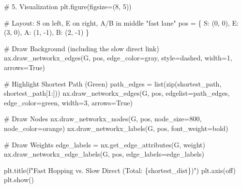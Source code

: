 \documentclass[
  letterpaper,
  DIV=11,
  numbers=noendperiod]{scrreprt}
\newenvironment{Shaded}{\begin{snugshade}}{\end{snugshade}}
\newcommand{\BuiltInTok}[1]{\textcolor[rgb]{0.00,0.23,0.31}{#1}}
\newcommand{\CommentTok}[1]{\textcolor[rgb]{0.37,0.37,0.37}{#1}}
\newcommand{\DecValTok}[1]{\textcolor[rgb]{0.68,0.00,0.00}{#1}}
\newcommand{\NormalTok}[1]{\textcolor[rgb]{0.00,0.23,0.31}{#1}}
\newcommand{\OperatorTok}[1]{\textcolor[rgb]{0.37,0.37,0.37}{#1}}
\newcommand{\SpecialCharTok}[1]{\textcolor[rgb]{0.37,0.37,0.37}{#1}}
\newcommand{\SpecialStringTok}[1]{\textcolor[rgb]{0.13,0.47,0.30}{#1}}
\newcommand{\StringTok}[1]{\textcolor[rgb]{0.13,0.47,0.30}{#1}}
\newcommand{\VariableTok}[1]{\textcolor[rgb]{0.07,0.07,0.07}{#1}}
\begin{document}
\begin{Shaded}
\begin{Highlighting}[]
\CommentTok{\# 5. Visualization}
\NormalTok{plt.figure(figsize}\OperatorTok{=}\NormalTok{(}\DecValTok{8}\NormalTok{, }\DecValTok{5}\NormalTok{))}

\CommentTok{\# Layout: S on left, E on right, A/B in middle "fast lane"}
\NormalTok{pos }\OperatorTok{=}\NormalTok{ \{}
    \StringTok{\textquotesingle{}S\textquotesingle{}}\NormalTok{: (}\DecValTok{0}\NormalTok{, }\DecValTok{0}\NormalTok{),}
    \StringTok{\textquotesingle{}E\textquotesingle{}}\NormalTok{: (}\DecValTok{3}\NormalTok{, }\DecValTok{0}\NormalTok{),}
    \StringTok{\textquotesingle{}A\textquotesingle{}}\NormalTok{: (}\DecValTok{1}\NormalTok{, }\OperatorTok{{-}}\DecValTok{1}\NormalTok{),}
    \StringTok{\textquotesingle{}B\textquotesingle{}}\NormalTok{: (}\DecValTok{2}\NormalTok{, }\OperatorTok{{-}}\DecValTok{1}\NormalTok{)}
\NormalTok{\}}

\CommentTok{\# Draw Background (including the slow direct link)}
\NormalTok{nx.draw\_networkx\_edges(G, pos, edge\_color}\OperatorTok{=}\StringTok{\textquotesingle{}gray\textquotesingle{}}\NormalTok{, style}\OperatorTok{=}\StringTok{\textquotesingle{}dashed\textquotesingle{}}\NormalTok{, width}\OperatorTok{=}\DecValTok{1}\NormalTok{, arrows}\OperatorTok{=}\VariableTok{True}\NormalTok{)}

\CommentTok{\# Highlight Shortest Path (Green)}
\NormalTok{path\_edges }\OperatorTok{=} \BuiltInTok{list}\NormalTok{(}\BuiltInTok{zip}\NormalTok{(shortest\_path, shortest\_path[}\DecValTok{1}\NormalTok{:]))}
\NormalTok{nx.draw\_networkx\_edges(G, pos, edgelist}\OperatorTok{=}\NormalTok{path\_edges, edge\_color}\OperatorTok{=}\StringTok{\textquotesingle{}green\textquotesingle{}}\NormalTok{, width}\OperatorTok{=}\DecValTok{3}\NormalTok{, arrows}\OperatorTok{=}\VariableTok{True}\NormalTok{)}

\CommentTok{\# Draw Nodes}
\NormalTok{nx.draw\_networkx\_nodes(G, pos, node\_size}\OperatorTok{=}\DecValTok{800}\NormalTok{, node\_color}\OperatorTok{=}\StringTok{\textquotesingle{}orange\textquotesingle{}}\NormalTok{)}
\NormalTok{nx.draw\_networkx\_labels(G, pos, font\_weight}\OperatorTok{=}\StringTok{\textquotesingle{}bold\textquotesingle{}}\NormalTok{)}

\CommentTok{\# Draw Weights}
\NormalTok{edge\_labels }\OperatorTok{=}\NormalTok{ nx.get\_edge\_attributes(G, }\StringTok{\textquotesingle{}weight\textquotesingle{}}\NormalTok{)}
\NormalTok{nx.draw\_networkx\_edge\_labels(G, pos, edge\_labels}\OperatorTok{=}\NormalTok{edge\_labels)}

\NormalTok{plt.title(}\SpecialStringTok{f"Fast Hopping vs. Slow Direct (Total: }\SpecialCharTok{\{}\NormalTok{shortest\_dist}\SpecialCharTok{\}}\SpecialStringTok{)"}\NormalTok{)}
\NormalTok{plt.axis(}\StringTok{\textquotesingle{}off\textquotesingle{}}\NormalTok{)}
\NormalTok{plt.show()}
\end{Highlighting}
\end{Shaded}
\end{document}
